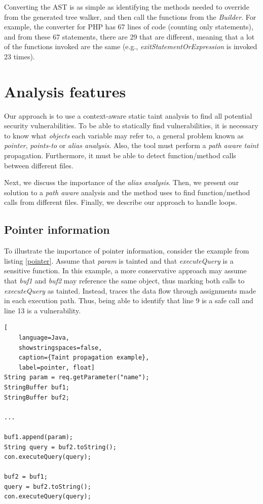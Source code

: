 

Converting the AST is as simple as identifying the methods needed to override from the generated tree walker, and then call the functions from the \textit{\astname{} Builder}.
For example, the converter for PHP has 67 lines of code (counting only statements), and from these 67 statements, there are 29 that are different, meaning that a lot of the functions invoked are the same (e.g., \textit{exitStatementOrExpression} is invoked 23 times). 


\section{Analysis features}
\label{analysisfeatures}
Our approach is to use a context-aware static taint analysis to find all potential security vulnerabilities. To be able to statically find vulnerabilities, it is necessary to know what \textit{objects} each variable may refer to, a general problem known as \textit{pointer}, \textit{points-to} or \textit{alias analysis}\cite{sridharan2013alias}. Also, the tool must perform a \textit{path aware} \textit{taint} propagation. Furthermore, it must be able to detect function/method calls between different files.

Next, we discuss the importance of the \textit{alias analysis}. Then, we present our solution to a \textit{path aware} analysis and the method \toolname{} uses to find function/method calls from different files. Finally, we describe our approach to handle loops.

\subsection{Pointer information}
To illustrate the importance of pointer information, consider the example from listing \ref{pointer}. Assume that \textit{param} is tainted and that \textit{executeQuery} is a sensitive function. In this example, a more conservative approach may assume that \textit{buf1} and \textit{buf2} may reference the same object, thus marking both calls to \textit{executeQuery} as tainted. Instead, \toolname{} traces the data flow through assignments made in each execution path. Thus, being able to identify that line 9 is a safe call and line 13 is a vulnerability.


\begin{lstlisting}[
    language=Java,
    showstringspaces=false,
    caption={Taint propagation example},
    label=pointer, float] 
String param = req.getParameter("name");
StringBuffer buf1;
StringBuffer buf2;

...

buf1.append(param);
String query = buf2.toString();
con.executeQuery(query);

buf2 = buf1;
query = buf2.toString();
con.executeQuery(query);
\end{lstlisting}

